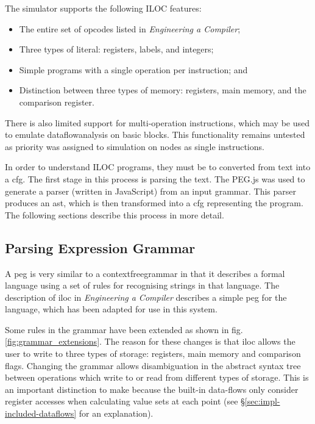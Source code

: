 \documentclass[bsc,twoside,singlespacing,parskip,logo,notimes,normalheadings]{infthesis}
\begin{document}
    The simulator supports the following ILOC features:

    \begin{itemize}
    \item The entire set of opcodes listed in {\em Engineering a
        Compiler};
    \item Three types of literal: registers, labels, and integers;
    \item Simple programs with a single operation per instruction; and
    \item Distinction between three types of memory: registers, main
      memory, and the comparison register.
    \end{itemize}

    There is also limited support for multi-operation instructions,
    which may be used to emulate \gls{dataflowanalysis} on basic
    blocks. This functionality remains untested as priority was
    assigned to simulation on nodes as single instructions.


    In order to understand ILOC programs, they must be to converted
    from text into a \gls{cfg}. The first stage in this process is
    parsing the text. The PEG.js\cite{pegjs} was used to generate a
    parser (written in JavaScript) from an input grammar. This parser
    produces an \gls{ast}, which is then transformed into a \gls{cfg}
    representing the program. The following sections describe this
    process in more detail.

        \subsection{Parsing Expression Grammar}\label{sec:peg}

        A \gls{peg} is very similar to a \gls{contextfreegrammar} in
        that it describes a formal language using a set of rules for
        recognising strings in that language. The description of
        \gls{iloc} in {\em Engineering a Compiler} describes a simple
        \gls{peg} for the language, which has been adapted for use in
        this system.
        
        Some rules in the grammar have been extended as shown in
        fig. \ref{fig:grammar_extensions}. The reason for these
        changes is that \gls{iloc} allows the user to write to three
        types of storage: registers, main memory and comparison
        flags. Changing the grammar allows disambiguation in the
        abstract syntax tree between operations which write to or read
        from different types of storage. This is an important
        distinction to make because the built-in data-flows only
        consider register accesses when calculating value sets at each
        point (see \S\ref{sec:impl-included-dataflows} for an
        explanation).
\end{document}
